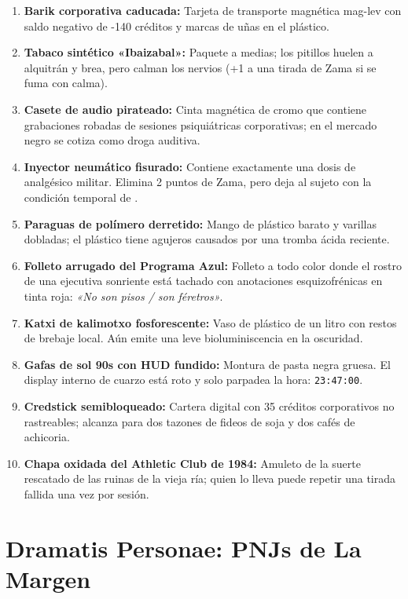 \begin{enumerate}
  \item \textbf{Barik corporativa caducada:} Tarjeta de transporte magnética mag-lev con saldo negativo de -140 créditos y marcas de uñas en el plástico.
  \item \textbf{Tabaco sintético «Ibaizabal»:} Paquete a medias; los pitillos huelen a alquitrán y brea, pero calman los nervios (+1 a una tirada de Zama si se fuma con calma).
  \item \textbf{Casete de audio pirateado:} Cinta magnética de cromo que contiene grabaciones robadas de sesiones psiquiátricas corporativas; en el mercado negro se cotiza como droga auditiva.
  \item \textbf{Inyector neumático fisurado:} Contiene exactamente una dosis de analgésico militar. Elimina 2 puntos de Zama, pero deja al sujeto con la condición temporal de .
  \item \textbf{Paraguas de polímero derretido:} Mango de plástico barato y varillas dobladas; el plástico tiene agujeros causados por una tromba ácida reciente.
  \item \textbf{Folleto arrugado del Programa Azul:} Folleto a todo color donde el rostro de una ejecutiva sonriente está tachado con anotaciones esquizofrénicas en tinta roja: \emph{«No son pisos / son féretros»}.
  \item \textbf{Katxi de kalimotxo fosforescente:} Vaso de plástico de un litro con restos de brebaje local. Aún emite una leve bioluminiscencia en la oscuridad.
  \item \textbf{Gafas de sol 90s con HUD fundido:} Montura de pasta negra gruesa. El display interno de cuarzo está roto y solo parpadea la hora: \texttt{23:47:00}.
  \item \textbf{Credstick semibloqueado:} Cartera digital con 35 créditos corporativos no rastreables; alcanza para dos tazones de fideos de soja y dos cafés de achicoria.
  \item \textbf{Chapa oxidada del Athletic Club de 1984:} Amuleto de la suerte rescatado de las ruinas de la vieja ría; quien lo lleva puede repetir una tirada fallida una vez por sesión.
\end{enumerate}

\section{Dramatis Personae: PNJs de La Margen}

